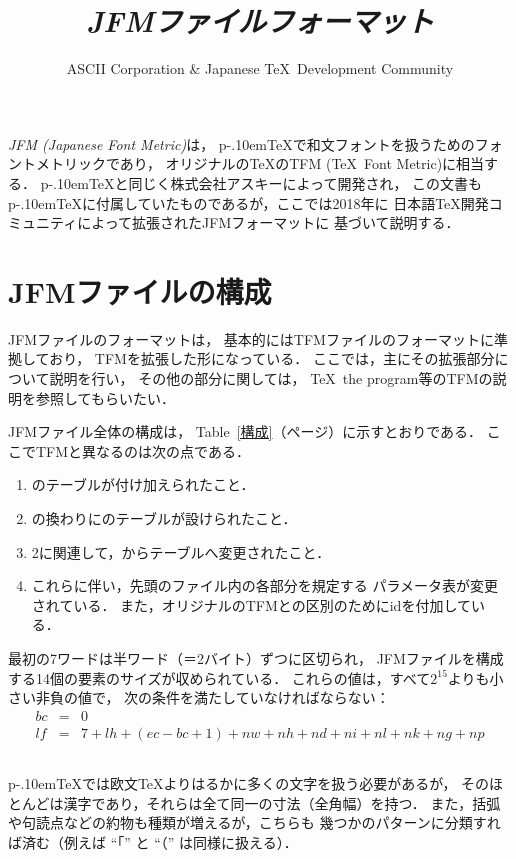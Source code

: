 \documentclass[a4paper,11pt,nomag]{jsarticle}
\title{\emph{JFMファイルフォーマット}}
\author{ASCII Corporation \& Japanese \TeX\ Development Community}
\def\size#1{\mathit{#1}}
\def\pTeX{p\kern-.10em\TeX}\def\upTeX{u\pTeX}
\begin{document}
\maketitle

\emph{JFM (Japanese Font Metric)}は，
\pTeX で和文フォントを扱うためのフォントメトリックであり，
オリジナルの\TeX のTFM (\TeX\ Font Metric)に相当する．
\pTeX と同じく株式会社アスキーによって開発され，
この文書も\pTeX に付属していたものであるが，ここでは2018年に
日本語\TeX 開発コミュニティによって拡張されたJFMフォーマットに
基づいて説明する．

\section{JFMファイルの構成}

JFMファイルのフォーマットは，
基本的にはTFMファイルのフォーマットに準拠しており，
TFMを拡張した形になっている．
ここでは，主にその拡張部分について説明を行い，
その他の部分に関しては，
\TeX\ the program等のTFMの説明を参照してもらいたい．

JFMファイル全体の構成は，
Table~\ref{構成}（\pageref{構成}ページ）に示すとおりである．
ここでTFMと異なるのは次の点である．
\begin{enumerate}
\item {}のテーブルが付け加えられたこと．
\item {}の換わりにのテーブルが設けられたこと．
\item 2に関連して，からテーブルへ変更されたこと．
\item これらに伴い，先頭のファイル内の各部分を規定する
	パラメータ表が変更されている．
	また，オリジナルのTFMとの区別のためにidを付加している．
\end{enumerate}
最初の7ワードは半ワード（＝2バイト）ずつに区切られ，
JFMファイルを構成する14個の要素のサイズが収められている．
これらの値は，すべて$2^{15}$よりも小さい非負の値で，
次の条件を満たしていなければならない：
\begin{eqnarray*}
\size{bc} &=& 0 \\
\size{lf} &=& 7+\size{lh}+(\size{ec}-\size{bc}+1)+\size{nw}+\size{nh}
               +\size{nd}+\size{ni}+\size{nl}+\size{nk}+\size{ng}+\size{np}
\end{eqnarray*}

\subsection{}
\pTeX では欧文\TeX よりはるかに多くの文字を扱う必要があるが，
そのほとんどは漢字であり，それらは全て同一の寸法（全角幅）を持つ．
また，括弧や句読点などの約物も種類が増えるが，こちらも
幾つかのパターンに分類すれば済む（例えば ``「'' と ``（'' は同様に扱える）．
\end{document}
